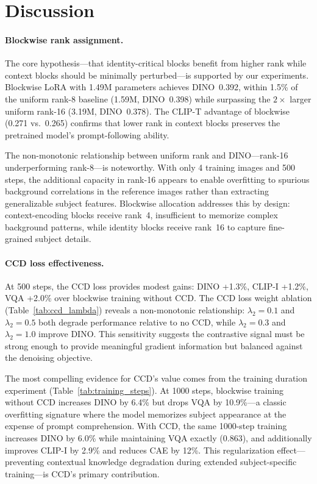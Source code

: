 \documentclass{article}
\begin{document}
\section{Discussion}
\label{sec:discussion}

\paragraph{Blockwise rank assignment.}
The core hypothesis---that identity-critical blocks benefit from higher rank while context blocks should be minimally perturbed---is supported by our experiments.
Blockwise LoRA with 1.49M parameters achieves DINO~0.392, within 1.5\% of the uniform rank-8 baseline (1.59M, DINO~0.398) while surpassing the $2\times$ larger uniform rank-16 (3.19M, DINO~0.378).
The CLIP-T advantage of blockwise (0.271 vs.\ 0.265) confirms that lower rank in context blocks preserves the pretrained model's prompt-following ability.

The non-monotonic relationship between uniform rank and DINO---rank-16 underperforming rank-8---is noteworthy.
With only 4 training images and 500 steps, the additional capacity in rank-16 appears to enable overfitting to spurious background correlations in the reference images rather than extracting generalizable subject features.
Blockwise allocation addresses this by design: context-encoding blocks receive rank~4, insufficient to memorize complex background patterns, while identity blocks receive rank~16 to capture fine-grained subject details.

\paragraph{CCD loss effectiveness.}
At 500 steps, the CCD loss provides modest gains: DINO +1.3\%, CLIP-I +1.2\%, VQA +2.0\% over blockwise training without CCD.
The CCD loss weight ablation (Table~\ref{tab:ccd_lambda}) reveals a non-monotonic relationship: $\lambda_2{=}0.1$ and $\lambda_2{=}0.5$ both degrade performance relative to no CCD, while $\lambda_2{=}0.3$ and $\lambda_2{=}1.0$ improve DINO.
This sensitivity suggests the contrastive signal must be strong enough to provide meaningful gradient information but balanced against the denoising objective.

The most compelling evidence for CCD's value comes from the training duration experiment (Table~\ref{tab:training_steps}).
At 1000 steps, blockwise training without CCD increases DINO by 6.4\% but drops VQA by 10.9\%---a classic overfitting signature where the model memorizes subject appearance at the expense of prompt comprehension.
With CCD, the same 1000-step training increases DINO by 6.0\% while maintaining VQA exactly (0.863), and additionally improves CLIP-I by 2.9\% and reduces CAE by 12\%.
This regularization effect---preventing contextual knowledge degradation during extended subject-specific training---is CCD's primary contribution.
\end{document}

